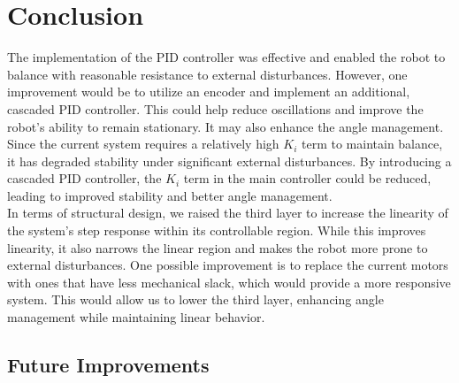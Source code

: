 \documentclass{article}
\begin{document}
\section{Conclusion}

\begin{minipage}{\linewidth}
    The implementation of the PID controller was effective and enabled the robot to
    balance with reasonable resistance to external disturbances. However, one
    improvement would be to utilize an encoder and implement an additional,
    cascaded PID controller. This could help reduce oscillations and improve the
    robot's ability to remain stationary. It may also enhance the angle
    management. Since the current system requires a relatively high $K_i$ term to
    maintain balance, it has degraded stability under significant external
    disturbances. By introducing a cascaded PID controller, the $K_i$ term in the main
    controller could be reduced, leading to improved stability and better angle
    management. \\

    In terms of structural design, we raised the third layer to increase the
    linearity of the system's step response within its controllable region. While
    this improves linearity, it also narrows the linear region and makes the robot
    more prone to external disturbances. One possible improvement is to replace the
    current motors with ones that have less mechanical slack, which would provide a
    more responsive system. This would allow us to lower the third layer, enhancing
    angle management while maintaining linear behavior. \\
\end{minipage}

\subsection{Future Improvements}
\end{document}
